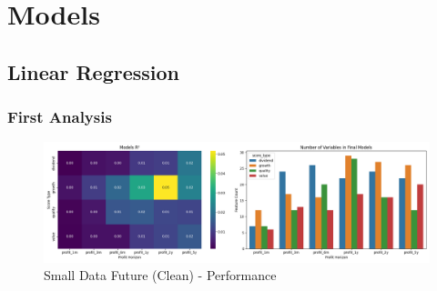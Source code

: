 \documentclass[11pt,english,a4paper,hidelinks]{book}
\begin{document}
\section{Models}

\subsection{Linear Regression}

\subsubsection{First Analysis}
\begin{figure}[H]
    \centering
    \includegraphics[width=1\textwidth]{images/code/models/linear_regression/first_model/basic_models_summary.png}
    \caption{Small Data Future (Clean) - Performance}
    \label{fig:first_linear_regression_performance}
\end{figure}
\end{document}
